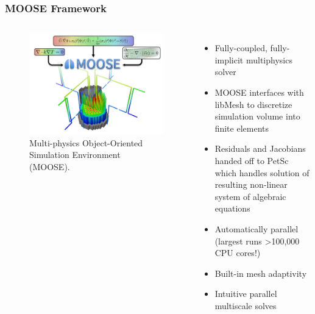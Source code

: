 \begin{frame}
  \frametitle{MOOSE Framework}
  \begin{columns}
    \column[t]{6cm}
  \begin{figure}[t]
     \vspace{-0.25in}
       \hspace*{-0.25in}
       \includegraphics[height=0.65\textheight]{./images/moose.png}
            \caption{Multi-physics Object-Oriented Simulation Environment (MOOSE).}
  \end{figure}
	\column[t]{6cm}
               \begin{itemize}      
	       \item Fully-coupled, fully-implicit multiphysics solver      
               \item MOOSE interfaces with libMesh to discretize simulation volume into finite elements
               \item Residuals and Jacobians handed off to PetSc which handles solution of resulting non-linear system of algebraic equations
	       \item Automatically parallel (largest runs \textgreater 100,000 CPU cores!)
	       \item Built-in mesh adaptivity
	       \item Intuitive parallel multiscale solves
               \end{itemize}

  \end{columns}
\end{frame}

